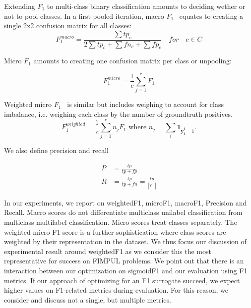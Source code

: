 Extending \(F_1\) to multi-class binary classification amounts to deciding wether or not to pool classes.
In a first pooled iteration, macro \(F_1\)~\cite{multilabelMetrics} equates to creating a single 2x2 confusion matrix for all classes:
$$F_1^{macro} = \frac{\sum tp_c}{2 \sum tp_c + \sum fn_c + \sum fp_c} \quad for \quad c \in C$$

Micro \(F_1\) \cite{threshForF1, multilabelMetrics} amounts to creating one confusion matrix per class or unpooling:

$$F_1^{micro} = \frac{1}{c} \sum_{j=1}^c F_1$$


Weighted micro \(F_1\)~\cite{weightedMetrics} is similar but includes weighing to account for class imbalance, i.e. weighing each class by the number of groundtruth positives.
\begin{equation}
F_1^{weighted} = \frac{1}{c} \sum_{j=1}^c n_j F_1 \text{ where } n_j = \sum_i \mathds{1}_{\mathbf{y_i^j} = 1}.
\end{equation}


We also define precision and recall

\begin{equation}
\begin{aligned} P &=\frac{t p}{t p+f p} \\ R &=\frac{t p}{t p+f n}=\frac{t p}{\left|Y^{+}\right|} \end{aligned}
\end{equation}

In our experiments, we report on weightedF1, microF1, macroF1, Precision and Recall. Macro scores do not differentiate multiclass unilabel classification from multiclass multilabel classification. Micro scores treat classes separately. The weighted micro F1 score is a further sophistication where class scores are weighted by their representation in the dataset. We thus focus our discussion of experimental result around weightedF1 as we consider this the most representative for success on FIMPUL problems. We point out that there is an interaction between our optimization on sigmoidF1 and our evaluation using F1 metrics. If our approach of optimizing for an F1 surrogate succeed, we expect higher values on F1-related metrics during evaluation. For this reason, we consider and discuss not a single, but multiple metrics.

